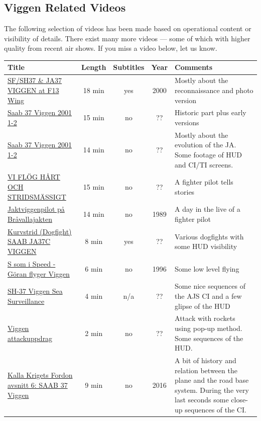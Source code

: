 \appendix
\begin{landscape}
\chapter{Viggen Related Videos}
The following selection of videos has been made based on operational content or visibility of details. There exist many more videos --- some of which with higher quality from recent air shows. If you miss a video below, let us know.

\begin{table}[!th]
\begin{tabular}{|p{5cm}|c|c|c|p{9cm}|}
\hline
Title & Length & Subtitles & Year & Comments \\
\hline

\href{https://www.youtube.com/watch?v=kBq5qA8r4dA}{SF/SH37 \& JA37 VIGGEN at F13 Wing} & 18 min & yes & 2000 & Mostly about the reconnaissance and photo version\\
\href{https://www.youtube.com/watch?v=0sRACNVVmpE}{Saab 37 Viggen 2001 1-2} & 15 min & no & ?? & Historic part plus early versions\\
\href{https://www.youtube.com/watch?v=pAPteuBsRGg}{Saab 37 Viggen 2001 1-2} & 14 min & no & ?? & Mostly about the evolution of the JA. Some footage of HUD and CI/TI screens.\\
\href{https://www.youtube.com/watch?v=fmqXa0oetUA}{VI FLÖG HÅRT OCH STRIDSMÄSSIGT} & 15 min & no & ?? & A fighter pilot tells stories\\
\href{https://www.youtube.com/watch?v=ErK3zaNRccE&}{Jaktviggenpilot på Bråvallajakten} & 14 min & no & 1989 & A day in the live of a fighter pilot\\
\href{https://www.youtube.com/watch?v=qaNt9_sQdGI}{Kurvstrid (Dogfight) SAAB JA37C VIGGEN} & 8 min & yes & ?? & Various dogfights with some HUD visibility\\
\href{https://www.youtube.com/watch?v=oB6-jJEWjWk}{S som i Speed - Göran flyger Viggen} & 6 min & no & 1996 & Some low level flying\\
\href{https://www.youtube.com/watch?v=gwgJNdWZlj0}{SH-37 Viggen Sea Surveillance} & 4 min & n/a & ?? & Some nice sequences of the AJS CI and a few glipse of the HUD\\
\href{https://www.youtube.com/watch?v=mgPS5-SbI0c}{Viggen attackuppdrag} & 2 min & no & ?? & Attack with rockets using pop-up method. Some sequences of the HUD.\\
\href{https://www.youtube.com/watch?v=eQjAp7bTnUg}{Kalla Krigets Fordon avsnitt 6: SAAB 37 Viggen} & 9 min & no & 2016 & A bit of history and relation between the plane and the road base system. During the very last seconds some close-up sequences of the CI.\\

\end{tabular}
\end{table}
\end{landscape}
